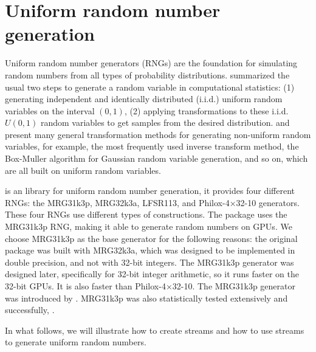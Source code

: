 \documentclass[article,nojss]{jss}\usepackage[]{graphicx}\usepackage[]{color}
\begin{document}
\section{Uniform random number generation} \label{}
Uniform random number generators (RNGs) are the foundation for simulating random numbers from all types of probability distributions. \cite{l2012random} summarized the usual two steps to generate a random variable in computational statistics: (1) generating independent and identically distributed (i.i.d.) uniform random variables on the interval $(0, 1)$, (2) applying transformations to these i.i.d. $U(0, 1)$ random variables to get samples from the desired distribution. \cite{l2012random} and \cite{robert2004random} present many general transformation methods for generating non-uniform random variables, for example, the most frequently used inverse transform method, the Box-Muller algorithm \citep{box1958note} for Gaussian random variable generation, and so on, which are all built on uniform random variables. %


 \citep{l2015clrng} is an  library for uniform random number generation, it provides four different RNGs: the MRG31k3p, MRG32k3a, LFSR113, and Philox-4×32-10 generators. These four RNGs use different types of constructions. The  package uses the MRG31k3p RNG, making it able to generate random numbers on GPUs. We choose MRG31k3p as the base generator for the following reasons:  the original  package \citep{l2002object} was built with MRG32k3a, which was designed to be implemented in double precision, and not with 32-bit integers. The MRG31k3p generator was designed later, specifically for 32-bit integer arithmetic, so it runs faster on the 32-bit GPUs. It is also faster than Philox-4×32-10. The MRG31k3p generator was introduced by \cite{rLEC00b}. MRG31k3p was also statistically tested extensively and successfully, \cite[see][]{rLEC07b}.    




In what follows, we will illustrate how to create streams and how to use streams to generate uniform random numbers. 

\end{document}
